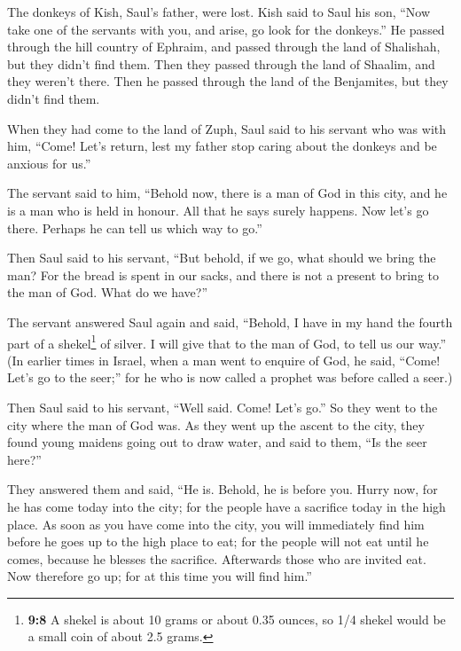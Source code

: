  The donkeys of Kish, Saul's father, were lost. Kish said
to Saul his son, ``Now take one of the servants with you, and arise, go
look for the donkeys.''  He passed through the hill
country of Ephraim, and passed through the land of Shalishah, but they
didn't find them. Then they passed through the land of Shaalim, and they
weren't there. Then he passed through the land of the Benjamites, but
they didn't find them.

 When they had come to the land of Zuph, Saul said to his
servant who was with him, ``Come! Let's return, lest my father stop
caring about the donkeys and be anxious for us.''

 The servant said to him, ``Behold now, there is a man of
God in this city, and he is a man who is held in honour. All that he
says surely happens. Now let's go there. Perhaps he can tell us which
way to go.''

 Then Saul said to his servant, ``But behold, if we go,
what should we bring the man? For the bread is spent in our sacks, and
there is not a present to bring to the man of God. What do we have?''

 The servant answered Saul again and said, ``Behold, I
have in my hand the fourth part of a shekel\footnote{\textbf{9:8} A
  shekel is about 10 grams or about 0.35 ounces, so 1/4 shekel would be
  a small coin of about 2.5 grams.} of silver. I will give that to the
man of God, to tell us our way.''  (In earlier times in
Israel, when a man went to enquire of God, he said, ``Come! Let's go to
the seer;'' for he who is now called a prophet was before called a
seer.)

 Then Saul said to his servant, ``Well said. Come! Let's
go.'' So they went to the city where the man of God was. 
As they went up the ascent to the city, they found young maidens going
out to draw water, and said to them, ``Is the seer here?''

 They answered them and said, ``He is. Behold, he is
before you. Hurry now, for he has come today into the city; for the
people have a sacrifice today in the high place.  As soon
as you have come into the city, you will immediately find him before he
goes up to the high place to eat; for the people will not eat until he
comes, because he blesses the sacrifice. Afterwards those who are
invited eat. Now therefore go up; for at this time you will find him.''

